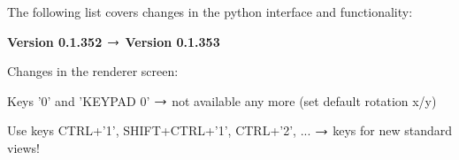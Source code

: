 The following list covers changes in the python interface and functionality:
\bi
	\item {\bf Version 0.1.352 $\rightarrow$ Version 0.1.353}
	\item[] Changes in the renderer screen:
	\bi \ttfamily
	  \item Keys '0' and 'KEYPAD 0' $\rightarrow$ not available any more (set default rotation x/y)
	  \item Use keys CTRL+'1', SHIFT+CTRL+'1', CTRL+'2', ...  $\rightarrow$ keys for new standard views!
	\ei

